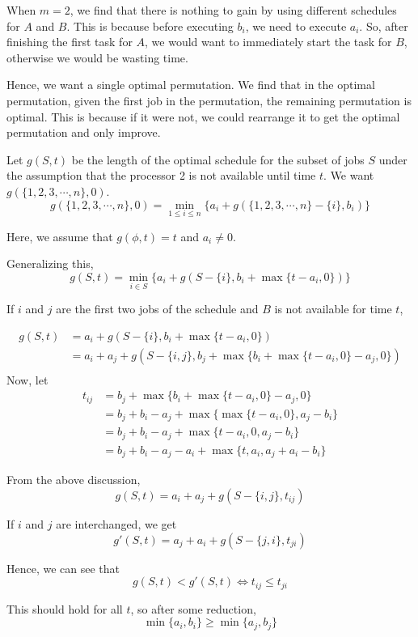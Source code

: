 \documentclass[12pt,letterpaper]{article}
\theoremstyle{definition}
\begin{document}
When $m=2$, we find that there is nothing to gain by using different schedules for $A$ and $B$. This is because before executing $b_i$, we need to execute $a_i$. So, after finishing the first task for $A$, we would want to immediately start the task for $B$, otherwise we would be wasting time.

Hence, we want a single optimal permutation. We find that in the optimal permutation, given the first job in the permutation, the remaining permutation is optimal. This is because if it were not, we could rearrange it to get the optimal permutation and only improve.

Let $g(S,t)$ be the length of the optimal schedule for the subset of jobs $S$ under the assumption that the processor 2 is not available until time $t$. We want $g(\{1,2,3,\cdots, n\},0)$.
\[g(\{1,2,3,\cdots,n\},0) = \min_{1 \leq i \leq n} \{a_i + g(\{1,2,3,\cdots,n\} - \{i\},b_i)\}\]

Here, we assume that $g(\phi,t) = t$ and $a_i \neq 0$.

Generalizing this,
\[g(S,t) = \min_{i \in S} \{a_i + g(S-\{i\},b_i + \max\{t-a_i,0\})\}\]

If $i$ and $j$ are the first two jobs of the schedule and $B$ is not available for time $t$,

\begin{align*}
  g(S,t) &= a_i + g(S- \{i\},b_i + \max \{t-a_i,0\}) \\
         &= a_i + a_j + g(S-\{i,j\},b_j + \max \{b_i + \max\{t-a_i,0\}-a_j,0\}) \\
\end{align*}
Now, let
\begin{align*}
  t_{ij} &= b_j + \max \{b_i + \max \{t-a_i,0\} - a_j,0\} \\
         &= b_j + b_i -a_j + \max \{ \max \{t-a_i,0\}, a_j - b_i \} \\ 
         &= b_j + b_i - a_j + \max \{t-a_i,0,a_j-b_i\} \\
         &= b_j + b_i - a_j - a_i + \max \{t,a_i,a_j+a_i -b_i\}
\end{align*}

From the above discussion,
\[g(S,t) = a_i + a_j + g(S-\{i,j\},t_{ij})\]

If $i$ and $j$ are interchanged, we get
\[g'(S,t) = a_j + a_i + g(S-\{j,i\},t_{ji})\]

Hence, we can see that
\[g(S,t) < g'(S,t) \Leftrightarrow t_{ij} \leq t_{ji}\]

This should hold for all $t$, so after some reduction, 
\[\min\{a_i,b_i\} \geq \min \{a_j,b_j\}\]
\end{document}
